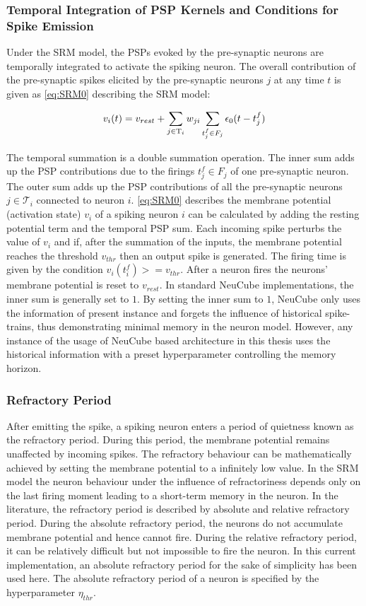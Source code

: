 \subsubsection{Temporal Integration of PSP Kernels and Conditions for Spike Emission}
Under the SRM model, the PSPs evoked by the pre-synaptic neurons are temporally integrated to activate the spiking neuron. The overall contribution of the pre-synaptic spikes elicited by the pre-synaptic neurons $j$ at any time $t$ is given as \equationname \ref{eq:SRM0} describing the SRM model:


\begin{equation}
v_i(t)=v_{rest}+\sum_{j\in \mathrm{T}_i }w_{ji}\sum_{t_j^f\in F_j}\epsilon_0(t-t_j^f)
\label{eq:SRM0}
\end{equation}

The temporal summation is a double summation operation. The inner sum adds up the PSP contributions due to the firings $t_j^f\in F_j$ of one pre-synaptic neuron. The outer sum adds up the PSP contributions of all the pre-synaptic neurons $j\in \mathcal{T}_i$ connected to neuron $i$. \equationname \ref{eq:SRM0} describes the membrane potential (activation state) $v_i$ of a spiking neuron $i$ can be calculated by adding the resting potential term and the temporal PSP sum. Each incoming spike perturbs the value of $v_i$ and if, after the summation of the inputs, the membrane potential reaches the threshold $v_{thr}$ then an output spike is generated. The firing time is given by the condition $v_i(t_i^f)>=v_{thr}$. After a neuron fires the neurons' membrane potential is reset to $v_{rest}$. In standard NeuCube implementations, the inner sum is generally set to $1$. By setting the inner sum to $1$, NeuCube only uses the information of present instance and forgets the influence of historical spike-trains, thus demonstrating minimal memory in the neuron model. However, any instance of the usage of NeuCube based architecture in this thesis uses the historical information with a preset hyperparameter controlling the memory horizon.   

\subsubsection{Refractory Period}
After emitting the spike, a spiking neuron enters a period of quietness known as the refractory period. During this period, the membrane potential remains unaffected by incoming spikes. The refractory behaviour can be mathematically achieved by setting the membrane potential to a infinitely low value. In the SRM model the neuron behaviour under the influence of refractoriness depends only on the last firing moment leading to a short-term memory in the neuron. In the literature, the refractory period is described by absolute and relative refractory period. During the absolute refractory period, the neurons do not accumulate membrane potential and hence cannot fire. During the relative refractory period, it can be relatively difficult but not impossible to fire the neuron. In this current implementation, an absolute refractory period for the sake of simplicity has been used here. The absolute refractory period of a neuron is specified by the hyperparameter $\eta_{thr}$. 

